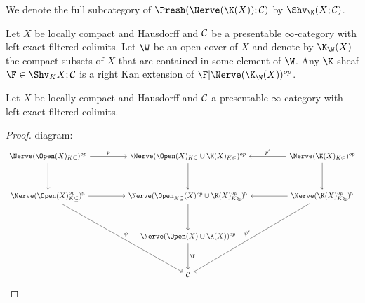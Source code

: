 \documentclass[../thesis.tex]{subfiles}
\begin{document}
\begin{definition}
    We denote the full subcategory of $\Presh(\Nerve(\K(X)); \C)$ by $\Shv_{\K}(X;\C)$.
\end{definition}
\begin{lemma}
    Let $X$ be locally compact and Hausdorff and $\mathcal{C}$ be a presentable $\infty$-category with left exact filtered colimits.
    Let $\W$ be an open cover of $X$ and denote by $\K_{\W}(X)$ the compact subsets of $X$ that are contained in some element of $\W$.
    Any $\K$-sheaf $\F\in \Shv_K{X;\C}$ is a right Kan extension of $\F|\Nerve(\K_{\W}(X))^{op}$.
\end{lemma}
\begin{thm}
    Let $X$ be locally compact and Hausdorff and $\mathcal{C}$ a presentable $\infty$-category with left exact filtered colimits.

\end{thm}
\begin{proof}
    diagram:
    \[\begin{tikzcd}
            {\Nerve(\Open(X)_{K\subseteq})^{op}} && {\Nerve(\Open(X)_{K\subseteq}\cup \K(X)_{K\Subset})^{op}} && {\Nerve(\K(X)_{K\Subset})^{op}} \\
            \\
            {\Nerve(\Open(X)_{K\subseteq}^{op})^{\triangleright}} && {\Nerve(\Open_{K\subseteq}(X)^{op}\cup \K(X)_{K\Subset}^{op})^{\triangleright}} && {\Nerve(\K(X)_{K\Subset}^{op})^{\triangleright}} \\
            \\
            && {\Nerve(\Open(X)\cup \K(X))^{op}} \\
            \\
            && \C
            \arrow["p", from=1-1, to=1-3]
            \arrow["{p'}"', from=1-5, to=1-3]
            \arrow[from=1-1, to=3-1]
            \arrow[from=3-1, to=3-3]
            \arrow[from=3-5, to=3-3]
            \arrow[from=1-3, to=3-3]
            \arrow[from=3-3, to=5-3]
            \arrow["\F", from=5-3, to=7-3]
            \arrow["{\psi'}"', from=3-5, to=7-3]
            \arrow["\psi", from=3-1, to=7-3]
            \arrow[from=1-5, to=3-5]
        \end{tikzcd}\]
\end{proof}
\end{document}
